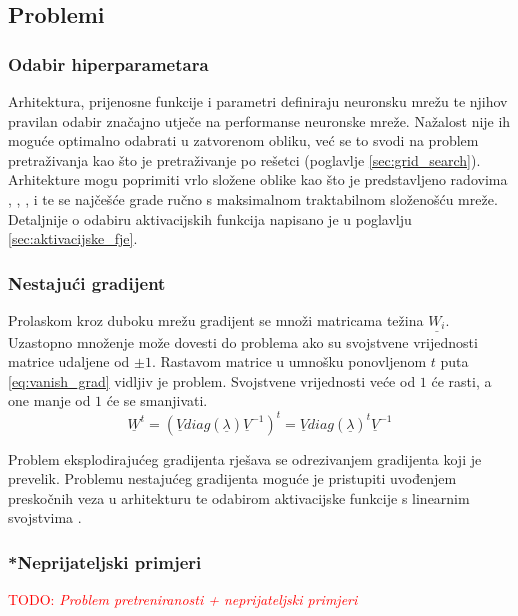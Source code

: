 \documentclass[times, utf8, numeric, diplomski]{fer}
\def\mat#1{\underline{#1}}
\def\secref#1{(poglavlje \ref{#1})}
\def\TODO#1{\noindent\textcolor{red}{TODO: \textit{#1}}\newline}
\def\todo#1{\TODO{#1}}
\begin{document}
\subsection{Problemi}
\subsubsection{Odabir hiperparametara}
Arhitektura, prijenosne funkcije i parametri definiraju neuronsku mrežu te njihov pravilan odabir značajno utječe na performanse neuronske mreže. Nažalost nije ih moguće optimalno odabrati u zatvorenom obliku, već se to svodi na problem pretraživanja kao što je pretraživanje po rešetci \secref{sec:grid_search}. Arhitekture mogu poprimiti vrlo složene oblike kao što je predstavljeno radovima \citet{highwaynet}, \citet{resnet}, \citet{densenet}, \citet{inceptionnet} i \citet{yolo} te se najčešće grade ručno s maksimalnom traktabilnom složenošću mreže. Detaljnije o odabiru aktivacijskih funkcija napisano je u poglavlju \ref{sec:aktivacijske_fje}.

\subsubsection{Nestajući gradijent}
\label{sec:nestajući_grad}
Prolaskom kroz duboku mrežu gradijent se množi matricama težina $\mat{W_i}$. Uzastopno množenje može dovesti do problema ako su svojstvene vrijednosti matrice udaljene od $\pm 1$. Rastavom matrice u umnošku ponovljenom $t$ puta \eqref{eq:vanish_grad} vidljiv je problem. Svojstvene vrijednosti veće od $1$ će rasti, a one manje od $1$ će se smanjivati. \citep{goodfellowbook}
\begin{equation}
\label{eq:vanish_grad}
\mat{W}^t = (\mat{V} diag(\mat{\lambda}) \mat{V}^{-1})^t = \mat{V} diag(\mat{\lambda})^t\mat{V}^{-1}
\end{equation}

Problem eksplodirajućeg gradijenta rješava se odrezivanjem gradijenta koji je prevelik. Problemu nestajućeg gradijenta moguće je pristupiti uvođenjem preskočnih veza u arhitekturu \citep{highwaynet,resnet,densenet} te odabirom aktivacijske funkcije s linearnim svojstvima \citep{elish}.

\iffalse %
\subsubsection{*Neprijateljski primjeri}
\todo{Problem pretreniranosti + neprijateljski primjeri}
\end{document}
